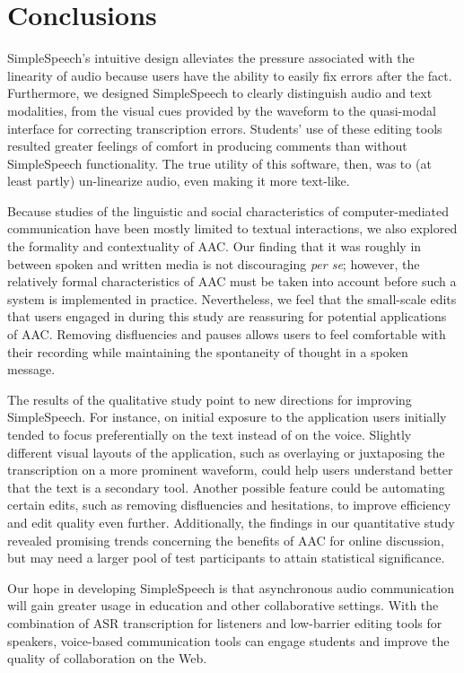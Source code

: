 \section{Conclusions}

SimpleSpeech's intuitive design alleviates the pressure associated with the linearity of audio because users have the ability to easily fix errors after the fact.
Furthermore, we designed SimpleSpeech to clearly distinguish audio and text modalities, from the visual cues provided by the waveform to the quasi-modal interface for correcting transcription errors.
Students' use of these editing tools resulted greater feelings of comfort in producing comments than without SimpleSpeech functionality.
The true utility of this software, then, was to (at least partly) un-linearize audio, even making it more text-like.

Because studies of the linguistic and social characteristics of computer-mediated communication have been mostly limited to textual interactions, we also explored the formality and contextuality of AAC. 
Our finding that it was roughly in between spoken and written media is not discouraging \textit{per se}; however, the relatively formal characteristics of AAC must be taken into account before such a system is implemented in practice.
Nevertheless, we feel that the small-scale edits that users engaged in during this study are reassuring for potential applications of AAC.
Removing disfluencies and pauses allows users to feel comfortable with their recording while maintaining the spontaneity of thought in a spoken message.

The results of the qualitative study point to new directions for improving SimpleSpeech. 
For instance, on initial exposure to the application users initially tended to focus preferentially on the text instead of on the voice.
Slightly different visual layouts of the application, such as overlaying or juxtaposing the transcription on a more prominent waveform, could help users understand better that the text is a secondary tool.
Another possible feature could be automating certain edits, such as removing disfluencies and hesitations, to improve efficiency and edit quality even further.
Additionally, the findings in our quantitative study revealed promising trends concerning the benefits of AAC for online discussion, but may need a larger pool of test participants to attain statistical significance.

Our hope in developing SimpleSpeech is that asynchronous audio communication will gain greater usage in education and other collaborative settings. 
With the combination of ASR transcription for listeners and low-barrier editing tools for speakers, voice-based communication tools can engage students and improve the quality of collaboration on the Web.
